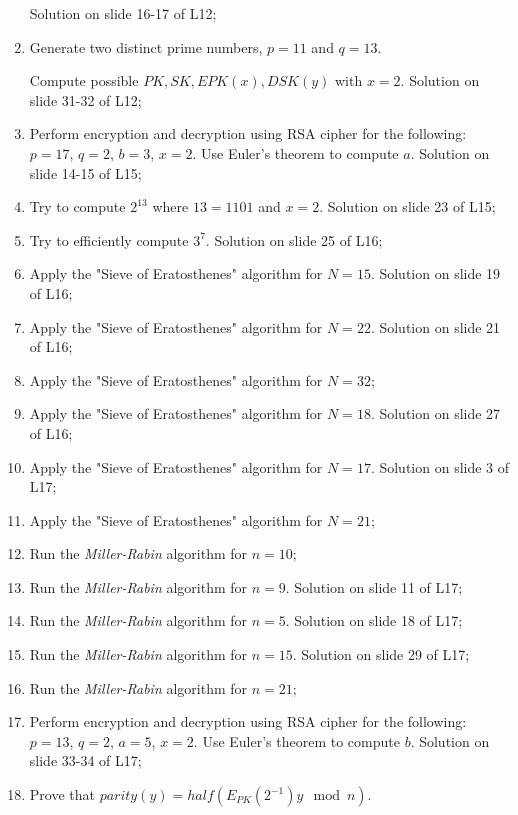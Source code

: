 \begin{enumerate}
    Solution on slide 16-17 of L12;

    \item Generate two distinct prime numbers, $p=11$ and $q=13$. 
    
    Compute possible $PK, SK, EPK(x), DSK(y)$ with $x=2$. Solution on slide 31-32 of L12;

    \item Perform encryption and decryption using RSA cipher for the following: $p = 17$, $q = 2$, $b = 3$, $x = 2$. Use Euler's theorem to compute $a$. Solution on slide 14-15 of L15;

    \item Try to compute $2^{13}$ where $13 = 1101$ and $x = 2$. Solution on slide 23 of L15;

    \item Try to efficiently compute $3^7$. Solution on slide 25 of L16;

    \item Apply the "Sieve of Eratosthenes" algorithm for $N = 15$. Solution on slide 19 of L16;

    \item Apply the "Sieve of Eratosthenes" algorithm for $N = 22$. Solution on slide 21 of L16;

    \item Apply the "Sieve of Eratosthenes" algorithm for $N = 32$;

    \item Apply the "Sieve of Eratosthenes" algorithm for $N = 18$. Solution on slide 27 of L16;

    \item Apply the "Sieve of Eratosthenes" algorithm for $N = 17$. Solution on slide 3 of L17;

    \item Apply the "Sieve of Eratosthenes" algorithm for $N = 21$;

    \item Run the \textit{Miller-Rabin} algorithm for $n = 10$;

    \item Run the \textit{Miller-Rabin} algorithm for $n = 9$. Solution on slide 11 of L17;

    \item Run the \textit{Miller-Rabin} algorithm for $n = 5$. Solution on slide 18 of L17;

    \item Run the \textit{Miller-Rabin} algorithm for $n = 15$. Solution on slide 29 of L17;

    \item Run the \textit{Miller-Rabin} algorithm for $n = 21$;

    \item Perform encryption and decryption using RSA cipher for the following: $p = 13$, $q = 2$, $a = 5$, $x = 2$. Use Euler's theorem to compute $b$. Solution on slide 33-34 of L17; 

    \item Prove that $\mathit{parity}(y) = \mathit{half}(E_{PK}(2^{-1}) y \mod n)$.

\end{enumerate}
